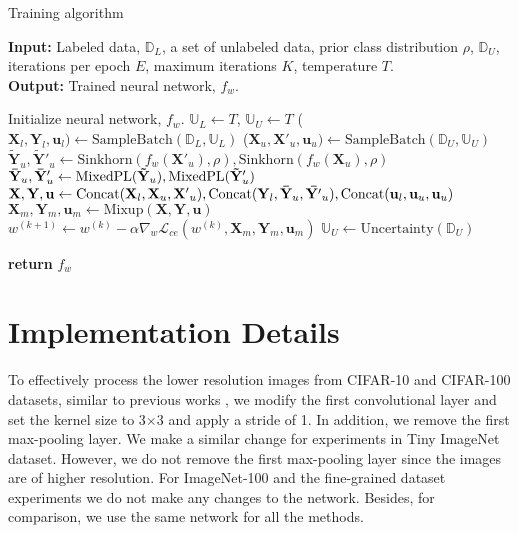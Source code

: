 \documentclass[runningheads]{eccv2022submission}
\begin{document}
\begin{algorithm*}[h]
\caption{Training algorithm}
\label{alg: alogirthm1}
\textbf{Input:} Labeled data, $\mathbb{D}_L$, a set of unlabeled data, prior class distribution $\rho$, $\mathbb{D}_U$, iterations per epoch $E$, maximum iterations $K$, temperature $T$.  \\
\textbf{Output:} Trained neural network, $f_{w}$.
\begin{algorithmic}[1]
\State Initialize neural network, $f_{w}$.
\State $\mathbb{U}_L \gets T$, $\mathbb{U}_U \gets T$ 
    \State ($\mathbf{X}_l, \mathbf{Y}_l, \mathbf{u}_l)  \gets \mathrm{SampleBatch}(\mathbb{D}_L, \mathbb{U}_L)$
    \State ($\mathbf{X}_u, \mathbf{X'}_u, \mathbf{u}_u) \gets\mathrm{SampleBatch}(\mathbb{D}_U, \mathbb{U}_U)$
  \State $\mathbf{\tilde{Y}}_u, \mathbf{\tilde{Y}'}_u \gets \mathrm{Sinkhorn}(f_w(\mathbf{X'}_u), \rho), \mathrm{Sinkhorn}(f_w(\mathbf{X}_u), \rho)$  
  \State $\mathbf{\Bar{Y}}_u, \mathbf{\Bar{Y}'}_u  \gets \mathrm{MixedPL}(\mathbf{\tilde{Y}}_u), \mathrm{MixedPL}(\mathbf{\tilde{Y}'}_u)$
  \State $\mathbf{{X}}, \mathbf{{Y}}, \mathbf{{u}} \gets \mathrm{Concat}(\mathbf{X}_l, \mathbf{X}_u, \mathbf{X'}_u), \mathrm{Concat}(\mathbf{Y}_l, \mathbf{\Bar{Y}}_u, \mathbf{\Bar{Y'}}_u), \mathrm{Concat}(\mathbf{u}_l, \mathbf{{u}}_u, \mathbf{{u}}_u)$
  \State $\mathbf{{X}}_m, \mathbf{{Y}}_m, \mathbf{{u}}_m \gets \mathrm{Mixup}(\mathbf{{X}}, \mathbf{{Y}}, \mathbf{{u}})$
  \State ${w}^{(k+1)} \gets w^{(k)} - \alpha\nabla_{w}\mathcal{L}_{ce}(w^{(k)}, \mathbf{{X}}_m, \mathbf{{Y}}_m, \mathbf{{u}}_m)$
  \State $\mathbb{U}_U \gets \mathrm{Uncertainty}(\mathbb{D}_U)$ 
  \EndIf
 \EndFor

\State \textbf{return} $f_{w}$

\end{algorithmic}
\end{algorithm*}




\section{Implementation Details}
\label{sec:implementation}
To effectively process the lower resolution images from CIFAR-10 and CIFAR-100 datasets, similar to previous works \cite{cao2022openworld,Han2020Automatically,fini2021unified}, we modify the first convolutional layer and set the kernel size to 3$\times$3 and apply a stride of 1. In addition, we remove the first max-pooling layer. We make a similar change for experiments in Tiny ImageNet dataset. However, we do not remove the first max-pooling layer since the images are of higher resolution. For ImageNet-100 and the fine-grained dataset experiments we do not make any changes to the network. Besides, for comparison, we use the same network for all the methods.       
\end{document}
